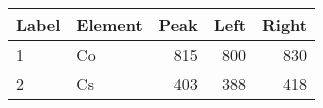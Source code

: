 \begin{tabular}{llrrr}
\toprule
Label & Element &  Peak &  Left &  Right \\
\midrule
1     &      Co &   815 &   800 &    830 \\
2     &      Cs &   403 &   388 &    418 \\
\bottomrule
\end{tabular}
